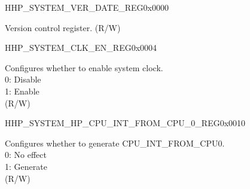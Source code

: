 \begin{register}{H}{HP\_SYSTEM\_VER\_DATE\_REG}{0x0000}\label{regdesc:HPSYSTEMVERDATEREG}
%
\regnewline%
\begin{regdesc}\begin{reglist}
\label{fielddesc:HPSYSTEMREGVERDATE}\item [HP\_SYSTEM\_REG\_VER\_DATE] Version control register. (R/W)
\end{reglist}\end{regdesc}
\end{register}


\begin{register}{H}{HP\_SYSTEM\_CLK\_EN\_REG}{0x0004}\label{regdesc:HPSYSTEMCLKENREG}
%
%
\regnewline%
\begin{regdesc}\begin{reglist}
\label{fielddesc:HPSYSTEMCLKEN}\item [HP\_SYSTEM\_CLK\_EN] Configures whether to enable system clock.\\
0: Disable\\
1: Enable\\
(R/W)
\end{reglist}\end{regdesc}
\end{register}


\begin{register}{H}{HP\_SYSTEM\_HP\_CPU\_INT\_FROM\_CPU\_0\_REG}{0x0010}\label{regdesc:HPSYSTEMHPCPUINTFROMCPU0REG}
%
%
\regnewline%
\begin{regdesc}\begin{reglist}
\label{fielddesc:HPSYSTEMCPUINTFROMCPU0}\item [HP\_SYSTEM\_CPU\_INT\_FROM\_CPU\_0] Configures whether to generate CPU\_INT\_FROM\_CPU0.\\
0: No effect\\
1: Generate\\
(R/W)
\end{reglist}\end{regdesc}
\end{register}


